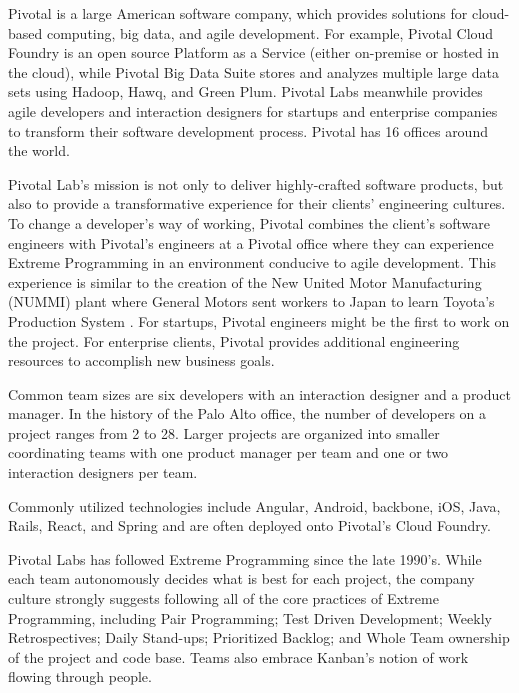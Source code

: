 Pivotal is a large American software company, which provides solutions for cloud-based computing, big data, and agile development. For example, Pivotal Cloud Foundry is an open source Platform as a Service (either on-premise or hosted in the cloud), while Pivotal Big Data Suite stores and analyzes multiple large data sets using Hadoop, Hawq, and Green Plum. Pivotal Labs meanwhile provides agile developers and interaction designers for startups and enterprise companies to transform their software development process. Pivotal has 16 offices around the world. 

Pivotal Lab's mission is not only to deliver highly-crafted software products, but also to provide a transformative experience for their clients' engineering cultures. To change a developer's way of working, Pivotal combines the client's software engineers with Pivotal's engineers at a Pivotal office where they can experience Extreme Programming in an environment conducive to agile development. This experience is similar to the creation of the New United Motor Manufacturing (NUMMI) plant where General Motors sent workers to Japan to learn Toyota's Production System \cite{Nummi}. For startups, Pivotal engineers might be the first to work on the project. For enterprise clients, Pivotal provides additional engineering resources to accomplish new business goals. 

Common team sizes are six developers with an interaction designer and a product manager. In the history of the Palo Alto office, the number of developers on a project ranges from 2 to 28. Larger projects are organized into smaller coordinating teams with one product manager per team and one or two interaction designers per team. 

Commonly utilized technologies include Angular, Android, backbone, iOS, Java, Rails, React, and Spring and are often deployed onto Pivotal's Cloud Foundry. 

Pivotal Labs has followed Extreme Programming \cite{BeckExtremeProgramming2004} since the late 1990's. While each team autonomously decides what is best for each project, the company culture strongly suggests following all of the core practices of Extreme Programming, including Pair Programming; Test Driven Development; Weekly Retrospectives; Daily Stand-ups; Prioritized Backlog; and Whole Team ownership of the project and code base. Teams also embrace Kanban's notion of work flowing through people.



